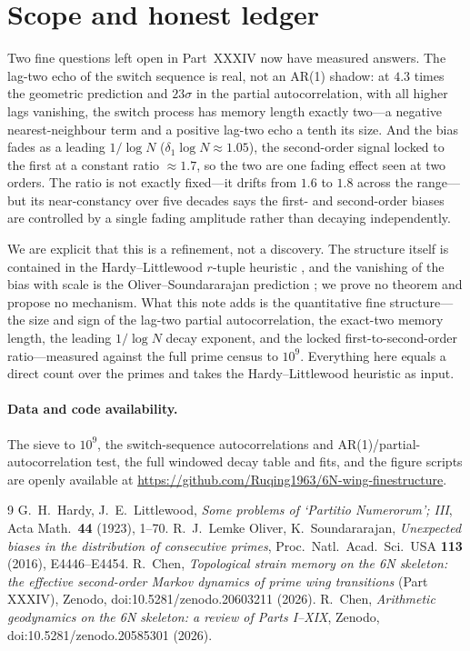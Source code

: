 \documentclass[11pt]{article}
\begin{document}
\section{Scope and honest ledger}
Two fine questions left open in Part~XXXIV now have measured answers. The lag-two echo of the switch
sequence is real, not an AR(1) shadow: at $4.3$ times the geometric prediction and $23\sigma$ in the
partial autocorrelation, with all higher lags vanishing, the switch process has memory length exactly
two---a negative nearest-neighbour term and a positive lag-two echo a tenth its size. And the bias
fades as a leading $1/\log N$ ($\delta_1\log N\approx1.05$), the second-order signal locked to the first
at a constant ratio $\approx1.7$, so the two are one fading effect seen at two orders. The ratio is not
exactly fixed---it drifts from $1.6$ to $1.8$ across the range---but its near-constancy over five
decades says the first- and second-order biases are controlled by a single fading amplitude rather than
decaying independently.

We are explicit that this is a refinement, not a discovery. The structure itself is contained in the
Hardy--Littlewood $r$-tuple heuristic \cite{HL}, and the vanishing of the bias with scale is the
Oliver--Soundararajan prediction \cite{OS}; we prove no theorem and propose no mechanism. What this note
adds is the quantitative fine structure---the size and sign of the lag-two partial autocorrelation, the
exact-two memory length, the leading $1/\log N$ decay exponent, and the locked first-to-second-order
ratio---measured against the full prime census to $10^{9}$. Everything here equals a direct count over
the primes and takes the Hardy--Littlewood heuristic as input.

\paragraph{Data and code availability.} The sieve to $10^{9}$, the switch-sequence autocorrelations and
AR(1)/partial-autocorrelation test, the full windowed decay table and fits, and the figure scripts are
openly available at \url{https://github.com/Ruqing1963/6N-wing-finestructure}.

\begin{thebibliography}{9}
 G.~H.~Hardy, J.~E.~Littlewood, \emph{Some problems of `Partitio Numerorum'; III}, Acta Math.\ \textbf{44} (1923), 1--70.
 R.~J.~Lemke Oliver, K.~Soundararajan, \emph{Unexpected biases in the distribution of consecutive primes}, Proc.\ Natl.\ Acad.\ Sci.\ USA \textbf{113} (2016), E4446--E4454.
 R.~Chen, \emph{Topological strain memory on the 6N skeleton: the effective second-order Markov dynamics of prime wing transitions} (Part XXXIV), Zenodo, doi:10.5281/zenodo.20603211 (2026).
 R.~Chen, \emph{Arithmetic geodynamics on the 6N skeleton: a review of Parts I--XIX}, Zenodo, doi:10.5281/zenodo.20585301 (2026).
\end{thebibliography}
\end{document}
